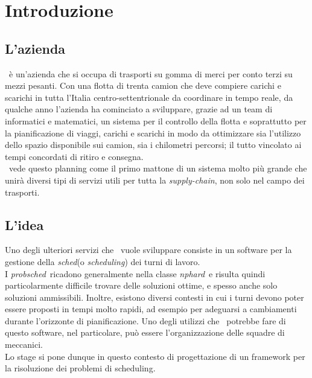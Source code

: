 
\chapter{Introduzione}
\label{cap:introduzione}


\section{L'azienda}

\TS\ è un'azienda che si occupa di trasporti su gomma di merci per conto terzi su mezzi pesanti. Con una flotta di trenta camion che deve compiere carichi e scarichi in tutta l'Italia centro-settentrionale da coordinare in tempo reale, da qualche anno l'azienda ha cominciato a sviluppare, grazie ad un team di informatici e matematici, un sistema per il controllo della flotta e soprattutto per la pianificazione di viaggi, carichi e scarichi in modo da ottimizzare sia l'utilizzo dello spazio disponibile sui camion, sia i chilometri percorsi; il tutto vincolato ai tempi concordati di ritiro e consegna. \\
\TS\ vede questo planning come il primo mattone di un sistema molto più grande che unirà diversi tipi di servizi utili per tutta la \emph{\gls{supply-chain}}\glsfirstoccur, non solo nel campo dei trasporti.

\section{L'idea}

Uno degli ulteriori servizi che \TS\ vuole sviluppare consiste in un software per la gestione della \emph{\gls{sched}}\glsfirstoccur (o \textit{scheduling}) dei turni di lavoro. \\ I \emph{\gls{probsched}}\glsfirstoccur\ ricadono generalmente nella classe \emph{\gls{nphard}}\glsfirstoccur\ e risulta quindi particolarmente difficile trovare delle soluzioni ottime, e spesso anche solo soluzioni ammissibili. Inoltre, esistono diversi contesti in cui i turni devono poter essere proposti in tempi molto rapidi, ad esempio per adeguarsi a cambiamenti durante l’orizzonte di pianificazione. Uno degli utilizzi che \TS\ potrebbe fare di questo software, nel particolare, può essere l'organizzazione delle squadre di meccanici. \\
Lo stage si pone dunque in questo contesto di progettazione di un framework per la risoluzione dei problemi di scheduling.

